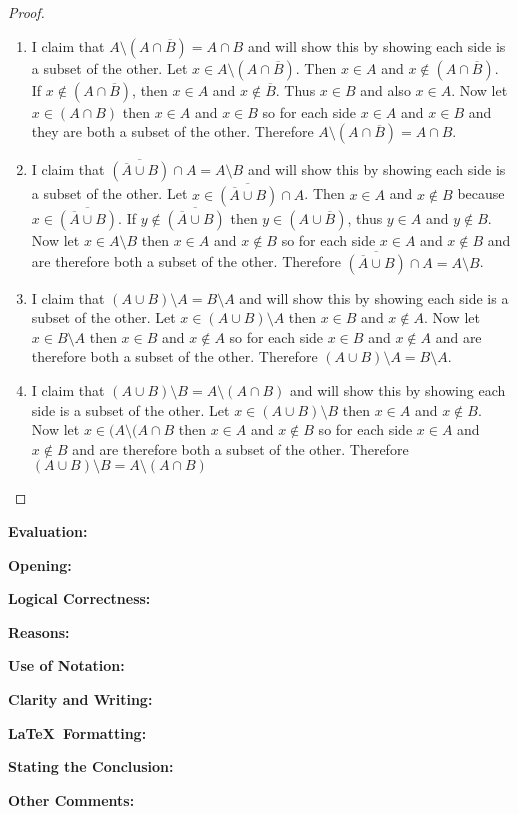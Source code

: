 \documentclass[11pt,titlepage]{article}		%
\def\rubric{\textbf{Evaluation:} \makebox[0.75in]{\hrulefill}

\vspace{.3in}

\textbf{Opening:} \makebox[0.75in]{\hrulefill}

\vspace{.3in}

\textbf{Logical Correctness:} \makebox[0.75in]{\hrulefill}

\vspace{.3in}

\textbf{Reasons:} \makebox[0.75in]{\hrulefill}

\vspace{.3in}

\textbf{Use of Notation:} \makebox[0.75in]{\hrulefill}

\vspace{.3in}

\textbf{Clarity and Writing:} \makebox[0.75in]{\hrulefill}

\vspace{.3in}

\textbf{\LaTeX\ Formatting:} \makebox[0.75in]{\hrulefill}

\vspace{.3in}

\textbf{Stating the Conclusion:} \makebox[0.75in]{\hrulefill}

\vspace{.3in}

\textbf{Other Comments:}

\vspace{1in}

}
\theoremstyle{definition}
\theoremstyle{theorem}
\begin{document}
\begin{proof}

\begin{enumerate}
    \item 
        I claim that $A\setminus (A\cap \overline{B}) = A\cap B$ and will show this by showing each side is a subset of the other.
        Let $x \in A\setminus (A\cap \overline{B})$. Then $x \in A$ and $x \notin (A\cap \overline{B})$.
        If $x \notin (A\cap \overline{B})$, then $x \in A$ and $x \notin \overline{B}$. Thus $x \in B$ and also $x \in A$.
        Now let $x \in (A\cap B)$ then $x \in A$ and $x \in B$ so for each side $x \in A$ and $x \in B$ and they are both a subset of the other. 
        Therefore $A\setminus (A\cap \overline{B}) = A\cap B$.
    \item
        I claim that $\overline{(\overline{A}\cup B)} \cap A = A\setminus B$ and will show this by showing each side is a subset of the other.
        Let $x \in \overline{(\overline{A}\cup B)} \cap A$. Then $x \in A$ and $x \notin B$ because $x \in \overline{(\overline{A}\cup B)}$.
        If $y \notin \overline{(\overline{A}\cup B)}$ then $y \in (A \cup \overline{B})$, thus $y \in A$ and $y \notin B$.
        Now let $x \in A\setminus B$ then $x \in A$ and $x \notin B$ so for each side $x \in A$ and $x \notin B$ and are therefore both a subset of the other.
        Therefore $\overline{(\overline{A}\cup B)} \cap A = A\setminus B$.
    \item
        I claim that $(A\cup B)\setminus A = B\setminus A$ and will show this by showing each side is a subset of the other.
        Let $x \in (A\cup B) \setminus A$ then $x \in B$ and $x \notin A$.
        Now let $x \in B\setminus A$ then $x \in B$ and $x \notin A$ so for each side $x \in B$ and $x \notin A$ and are therefore both a subset of the other.
        Therefore $(A\cup B)\setminus A = B\setminus A$.
    \item
        I claim that $(A\cup B) \setminus B = A\setminus (A\cap B)$ and will show this by showing each side is a subset of the other.
        Let $x \in (A\cup B) \setminus B$ then $x \in A$ and $x \notin B$.
        Now let $x \in (A\setminus (A\cap B$ then $x \in A$ and $x \notin B$ so for each side $x \in A$ and $x \notin B$ and are therefore both a subset of the other.
        Therefore $(A\cup B) \setminus B = A\setminus (A\cap B)$
\end{enumerate}
\end{proof}
\rubric
\end{document}
